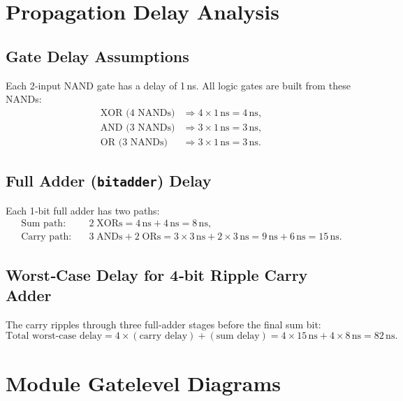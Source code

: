 \documentclass[12pt]{article}
\begin{document}
\section*{Propagation Delay Analysis}

\subsection*{Gate Delay Assumptions}
Each 2‑input NAND gate has a delay of 1\,ns. All logic gates are built from these NANDs:
\[
  \begin{aligned}
    \text{XOR (4 NANDs)} &\Rightarrow 4 \times 1\,\text{ns} = 4\,\text{ns},\\
    \text{AND (3 NANDs)} &\Rightarrow 3 \times 1\,\text{ns} = 3\,\text{ns},\\
    \text{OR  (3 NANDs)} &\Rightarrow 3 \times 1\,\text{ns} = 3\,\text{ns}.
  \end{aligned}
\]

\subsection*{Full Adder (\texttt{bitadder}) Delay}
Each 1‑bit full adder has two paths:
\[
  \begin{aligned}
    \text{Sum path:}  &\quad 2\;\text{XORs}
      = 4\,\text{ns} + 4\,\text{ns}
      = 8\,\text{ns},\\
    \text{Carry path:}&\quad 3\;\text{ANDs} + 2\;\text{ORs}
      = 3\times3\,\text{ns} + 2\times3\,\text{ns}
      = 9\,\text{ns} + 6\,\text{ns}
      = 15\,\text{ns}.
  \end{aligned}
\]

\subsection*{Worst‑Case Delay for 4‑bit Ripple Carry Adder}
The carry ripples through three full‑adder stages before the final sum bit:
\[
  \text{Total worst‑case delay}
    = 4 \times (\text{carry delay}) + (\text{sum delay})
    = 4 \times 15\,\text{ns} + 4 \times 8\,\text{ns}
    = \boxed{82\,\text{ns}}.
\]
\section*{Module Gatelevel Diagrams}
\end{document}
